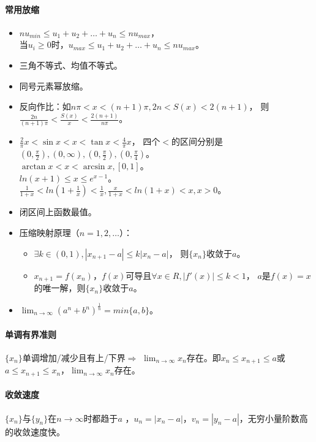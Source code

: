 \documentclass[
12pt, %
a4paper, 
oneside, %
headinclude,footinclude, %
]{scrartcl}
\begin{document}
\paragraph{常用放缩}
\begin{itemize}
\item $ n u_{min} \leq u_1 + u_2 + \dots +u_n \leq n u_{max} $， \\
当$ u_i \geq  0 $时，$ u_{max} \leq u_1 + u_2 + \dots +u_n \leq n u_{max} $。
\item 三角不等式、均值不等式。
\item 同号元素幂放缩。
\item 反向作比：如$ n \pi < x < (n + 1)\pi, 2n < S(x) < 2(n + 1) $，
则$ \frac{2n}{(n + 1)\pi} < \frac{S(x)}{x} < \frac{2(n + 1)}{n \pi} $。
\item $ \frac{2}{\pi}x < \sin x < x < \tan x < \frac{4}{\pi}x $，
四个$ < $的区间分别是$ (0, \frac{\pi}{2}), (0, \infty), (0, \frac{\pi}{2}), (0, \frac{\pi}{4}) $。 \\
$ \arctan x < x < \arcsin x, [0, 1] $。 \\
$ ln(x + 1) \leq x \leq e^{x - 1} $。 \\
$ \frac{1}{1 + x} < ln(1 + \frac{1}{x}) < \frac{1}{x}, \frac{x}{1 + x} < ln(1 + x) < x, x > 0 $。
\item 闭区间上函数最值。
\item 压缩映射原理（$ n = 1, 2, \dots $）：
\begin{itemize}
\item $ \exists k \in (0, 1), |x_{n + 1} - a| \leq k|x_n - a| $，
则$ \{x_n\} $收敛于$ a $。
\item $ x_{n + 1} = f(x_n) $，$ f(x) $可导且$ \forall x \in R, |f'(x)| \leq k < 1 $，
$ a $是$ f(x) = x $的唯一解，则$ \{x_n\} $收敛于$ a $。
\end{itemize}
\item $ \lim_{n \to \infty} (a^n + b^n)^{\frac{1}{n}} = min\{a, b\} $。
\end{itemize}
\paragraph{单调有界准则}$ \{x_n\} $单调增加/减少且有上/下界$ \Rightarrow $
$ \lim_{n \to \infty} x_n $存在。即$ x_n \leq x_{n + 1} \leq a $或
$ a \leq x_{n + 1} \leq x_n $，$ \lim_{n \to \infty} x_n $存在。
\paragraph{收敛速度}$ \{x_n\} $与$ \{y_n\} $在$ n \to \infty $时都趋于$ a $
，$ u_n = |x_n - a| $，$ v_n = |y_n - a| $，无穷小量阶数高的收敛速度快。
\end{document}
